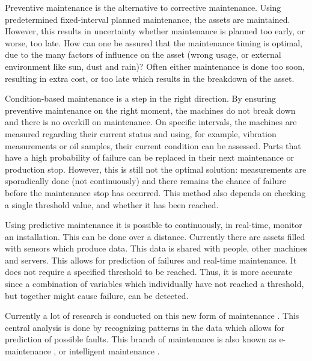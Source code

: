 Preventive maintenance is the alternative to corrective maintenance. Using predetermined fixed-interval planned maintenance, the assets are maintained. However, this results in uncertainty whether maintenance is planned too early, or worse, too late. How can one be assured that the maintenance timing is optimal, due to the many factors of influence on the asset (wrong usage, or external environment like sun, dust and rain)? Often either maintenance is done too soon, resulting in extra cost, or too late which results in the breakdown of the asset.

Condition-based maintenance is a step in the right direction. By ensuring preventive maintenance on the right moment, the machines do not break down and there is no overkill on maintenance. On specific intervals, the machines are measured regarding their current status and using, for example, vibration measurements or oil samples, their current condition can be assessed. Parts that have a high probability of failure can be replaced in their next maintenance or production stop. However, this is still not the optimal solution: measurements are sporadically done (not continuously) and there remains the chance of failure before the maintenance stop has occurred. This method also depends on checking a single threshold value, and whether it has been reached.

Using predictive maintenance it is possible to continuously, in real-time, monitor an installation. This can be done over a distance. Currently there are assets filled with sensors which produce data. This data is shared with people, other machines and servers. This allows for prediction of failures and real-time maintenance. It does not require a specified threshold to be reached. Thus, it is more accurate since a combination of variables which individually have not reached a threshold, but together might cause failure, can be detected.

Currently a lot of research is conducted on this new form of maintenance \citep{muller2008concept}. This central analysis is done by recognizing patterns in the data which allows for prediction of possible faults. This branch of maintenance is also known as e-maintenance \citep{yu2003multi}, or intelligent maintenance \citep{vermaak2007multi}.


